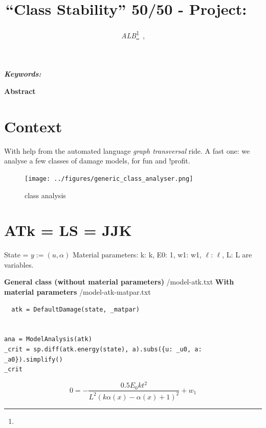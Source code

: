 \documentclass[]{article}
\title{
\vspace{-2em}
\textbf{``Class Stability'' 50/50} - 
Project: \textbf{\proj}~  }
\author{  
\emph{ALB}\footnote{}~,
}
\date{\vspace{-5em}}
\begin{document}
\ifpdf
{}
\else
{}
\fi

\maketitle


\begin{center}
\Large{}






\end{center}

\noindent\emph{\textbf{Keywords:} 
}

\medskip

\textbf{Abstract}
\section{Context}
With help from the automated language \emph{graph transversal} ride. A fast one:
we analyse a few classes of damage models, for fun and !profit.



\begin{figure}[htbp]
  \centering
  \texttt{[image: ../figures/generic\_class\_analyser.png]}
  \caption{class analysis}
  \label{fig:class-analyser}
\end{figure}

\section*{ATk = LS = JJK}
\newcommand{\ilen}{\ell}
\newcommand{\sigmac}{\sigma_c}

State = $y:=(u, \alpha)$
Material parameters:
{k: k, E0: 1, w1: w1, $\ilen$: $\ilen$, L: L} are variables.

\textbf{General class (without material parameters)}
{/model-atk.txt}
\textbf{With material parameters}
{/model-atk-matpar.txt}

\begin{verbatim}
  atk = DefaultDamage(state, _matpar)


ana = ModelAnalysis(atk)
_crit = sp.diff(atk.energy(state), a).subs({u: _u0, a: _a0}).simplify()
_crit
\end{verbatim}


$$
0=- \frac{0.5 E_{0} k t^{2}}{L^{2} \left(k \alpha{\left(x \right)} - \alpha{\left(x \right)} + 1\right)^{2}} + w_{1}
$$
\end{document}
